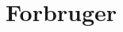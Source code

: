 \documentclass[../main.tex]{subfiles}
\begin{document}
\chapter{Forbruger} \label{Chap:Forbruger}
\end{document}
